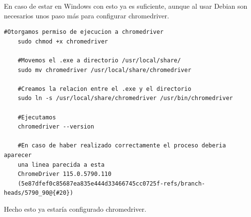 En caso de estar en Windows con esto ya es suficiente, aunque al usar Debian son necesarios unos paso más para configurar chromedriver.

\begin{lstlisting}[caption={Configuración chromedriver Debian}]
	#Otorgamos permiso de ejecucion a chromedriver
	sudo chmod +x chromedriver
	
	#Movemos el .exe a directorio /usr/local/share/
	sudo mv chromedriver /usr/local/share/chromedriver
	
	#Creamos la relacion entre el .exe y el directorio
	sudo ln -s /usr/local/share/chromedriver /usr/bin/chromedriver
	
	#Ejecutamos
	chromedriver --version
	
	#En caso de haber realizado correctamente el proceso deberia aparecer
	una linea parecida a esta
	ChromeDriver 115.0.5790.110
	(5e87dfef0c85687ea835e444d33466745cc0725f-refs/branch-heads/5790_90@{#20})
\end{lstlisting}

Hecho esto ya estaría configurado chromedriver.

